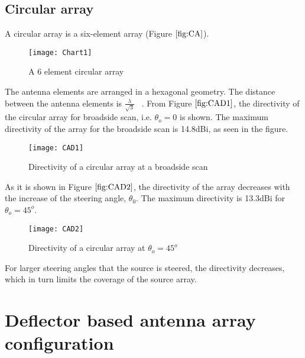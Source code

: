 \documentclass[titlepage]{article}
\begin{document}
\subsection{Circular array}
A circular array is a six-element array (Figure $\ref{fig:CA}$).
\begin{figure}[!hbp]
\centering
    \texttt{[image: Chart1]}
    \caption{A 6 element circular array }
    \label{fig:CA}
\end{figure}
The antenna elements are arranged in a hexagonal geometry. The distance between the antenna elements is $\frac{\lambda}{\sqrt{3}}$ ~\cite{2}. From Figure $\ref{fig:CAD1}$, the directivity of the circular array for broadside scan, i.e. $\theta_o = 0$ is shown. The maximum directivity of the array for the broadside scan is 14.8dBi, as seen in the figure.
\begin{figure}[!hbp]
    \centering
    \texttt{[image: CAD1]}
    \caption{Directivity of a circular array at a broadside scan}
    \label{fig:CAD1}
\end{figure}
As it is shown in Figure $\ref{fig:CAD2}$, the directivity of the array decreases with the increase of the steering angle, $\theta_0$. The maximum directivity is 13.3dBi for $\theta_o = 45 ^o$.
\begin{figure}[!hbp]
    \centering
    \texttt{[image: CAD2]}
    \caption{Directivity of a circular array at $\theta_o = 45^o$}
    \label{fig:CAD2}
\end{figure}
For larger steering angles that the source is steered, the directivity decreases, which in turn limits the coverage of the source array.
\section{Deflector based antenna array configuration}
\end{document}

